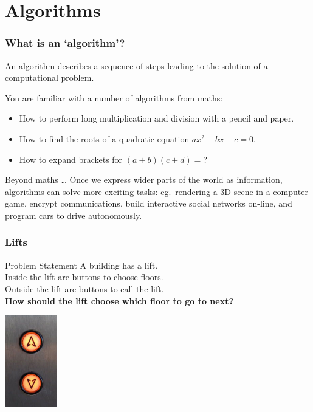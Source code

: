 \documentclass{beamer} %
\begin{document}
\section{Algorithms}

\begin{frame}
\frametitle{What is an `algorithm'?} 

An algorithm describes a sequence of steps leading to the solution of a computational problem.

\vspace{5mm}
You are familiar with a number of algorithms from maths:
\begin{itemize}
\item How to perform long multiplication and division with a pencil and paper.
\item How to find the roots of a quadratic equation $ax^2+bx+c = 0$.
\item How to expand brackets for $(a+b)(c+d) = ?$
\end{itemize}

\begin{block}{Beyond maths \ldots}
Once we express wider parts of the world as information, algorithms can solve more exciting tasks: eg.\ rendering a 3D scene in a computer game, encrypt communications, build interactive social networks on-line, and program cars to drive autonomously.
\end{block}

\end{frame}

\begin{frame}
  \frametitle{Lifts}

  \begin{block}{Problem Statement}
    A building has a lift.\\
    Inside the lift are buttons to choose floors.\\
    Outside the lift are buttons to call the lift.\\
    {\bf How should the lift choose which floor to go to next?}
  \end{block}
  \centering
  \includegraphics[height=40mm]{img/elevator.jpg}
\end{frame}
\end{document}
